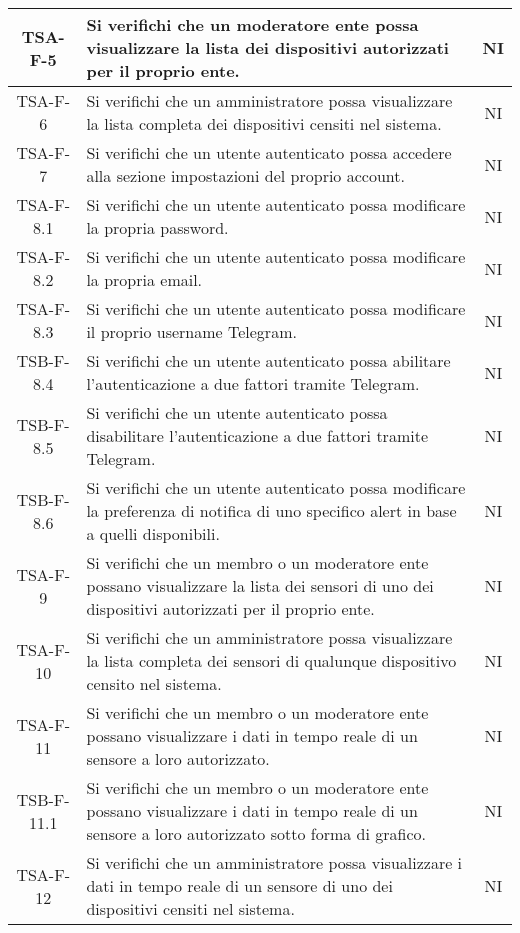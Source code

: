 \begin{center}
\begin{longtable}{|c|p{10cm}|c|}
			 \hline
			 TSA-F-5 & Si verifichi che un moderatore ente possa visualizzare la lista dei dispositivi autorizzati per il proprio ente. & NI \\
			 \hline
			 TSA-F-6 & Si verifichi che un amministratore possa visualizzare la lista completa dei dispositivi censiti nel sistema. & NI \\
			 \hline
			 TSA-F-7 & Si verifichi che un utente autenticato possa accedere alla sezione impostazioni del proprio account. & NI \\
			 \hline
			 TSA-F-8.1 & Si verifichi che un utente autenticato possa modificare la propria password. & NI \\
			 \hline
			 TSA-F-8.2 & Si verifichi che un utente autenticato possa modificare la propria email. & NI \\
			 \hline
			 TSA-F-8.3 & Si verifichi che un utente autenticato possa modificare il proprio username Telegram. & NI \\
			 \hline
			 TSB-F-8.4 & Si verifichi che un utente autenticato possa abilitare l'autenticazione a due fattori tramite Telegram. & NI \\
			 \hline
			 TSB-F-8.5 & Si verifichi che un utente autenticato possa disabilitare l'autenticazione a due fattori tramite Telegram. & NI \\
			 \hline
			 TSB-F-8.6 & Si verifichi che un utente autenticato possa modificare la preferenza di notifica di uno specifico alert in base a quelli disponibili. & NI \\
			 \hline
			 TSA-F-9 & Si verifichi che un membro o un moderatore ente possano visualizzare la lista dei sensori di uno dei dispositivi autorizzati per il proprio ente. & NI \\
			 \hline
			 TSA-F-10 & Si verifichi che un amministratore possa visualizzare la lista completa dei sensori di qualunque dispositivo censito nel sistema. & NI \\
			 \hline
			 TSA-F-11 & Si verifichi che un membro o un moderatore ente possano visualizzare i dati in tempo reale di un sensore a loro autorizzato. & NI \\
			 \hline
			 TSB-F-11.1 & Si verifichi che un membro o un moderatore ente possano visualizzare i dati in tempo reale di un sensore a loro autorizzato sotto forma di grafico. & NI \\
			 \hline
			 TSA-F-12 & Si verifichi che un amministratore possa visualizzare i dati in tempo reale di un sensore di uno dei dispositivi censiti nel sistema. & NI \\

\end{longtable}
\end{center}
